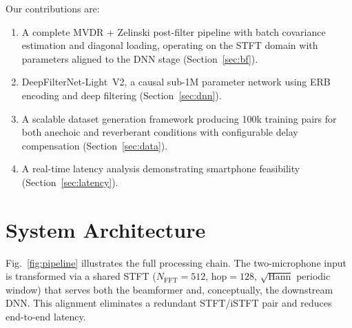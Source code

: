 \documentclass[a4paper]{article}
\begin{document}
Our contributions are:
\begin{enumerate}\itemsep0pt
\item A complete MVDR + Zelinski post-filter pipeline with batch covariance
      estimation and diagonal loading, operating on the STFT domain with
      parameters aligned to the DNN stage (Section~\ref{sec:bf}).
\item DeepFilterNet-Light~V2, a causal sub-1M parameter network using ERB
      encoding and deep filtering (Section~\ref{sec:dnn}).
\item A scalable dataset generation framework producing 100k training pairs
      for both anechoic and reverberant conditions with configurable delay
      compensation (Section~\ref{sec:data}).
\item A real-time latency analysis demonstrating smartphone feasibility
      (Section~\ref{sec:latency}).
\end{enumerate}

\section{System Architecture}
\label{sec:arch}

Fig.~\ref{fig:pipeline} illustrates the full processing chain.  The
two-microphone input is transformed via a shared STFT ($N_\text{FFT}=512$,
hop$=128$, $\sqrt{\text{Hann}}$ periodic window) that serves both the
beamformer and, conceptually, the downstream DNN.  This alignment eliminates
a redundant STFT/iSTFT pair and reduces end-to-end latency.
\end{document}
